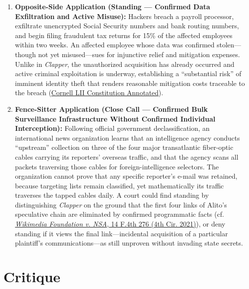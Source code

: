 \documentclass[12pt]{article}
\begin{document}
\begin{enumerate}
    \item \textbf{Opposite-Side Application (Standing --- Confirmed Data Exfiltration and Active Misuse):} Hackers breach a payroll processor, exfiltrate unencrypted Social Security numbers and bank routing numbers, and begin filing fraudulent tax returns for 15\% of the affected employees within two weeks. An affected employee whose data was confirmed stolen---though not yet misused---sues for injunctive relief and mitigation expenses. Unlike in \textit{Clapper}, the unauthorized acquisition has already occurred and active criminal exploitation is underway, establishing a ``substantial risk'' of imminent identity theft that renders reasonable mitigation costs traceable to the breach (\href{https://www.law.cornell.edu/constitution-conan/article-3/section-2/clause-1/actual-or-imminent-injury}{Cornell LII Constitution Annotated}).

    \item \textbf{Fence-Sitter Application (Close Call --- Confirmed Bulk Surveillance Infrastructure Without Confirmed Individual Interception):} Following official government declassification, an international news organization learns that an intelligence agency conducts ``upstream'' collection on three of the four major transatlantic fiber-optic cables carrying its reporters' overseas traffic, and that the agency scans all packets traversing those cables for foreign-intelligence selectors. The organization cannot prove that any specific reporter's e-mail was retained, because targeting lists remain classified, yet mathematically its traffic traverses the tapped cables daily. A court could find standing by distinguishing \textit{Clapper} on the ground that the first four links of Alito's speculative chain are eliminated by confirmed programmatic facts (cf. \href{https://law.justia.com/cases/federal/appellate-courts/ca4/20-1191/20-1191-2021-09-15.html}{\textit{Wikimedia Foundation v. NSA}, 14 F.4th 276 (4th Cir. 2021)}), or deny standing if it views the final link---incidental acquisition of a particular plaintiff's communications---as still unproven without invading state secrets.
\end{enumerate}

\section{Critique}
\end{document}
